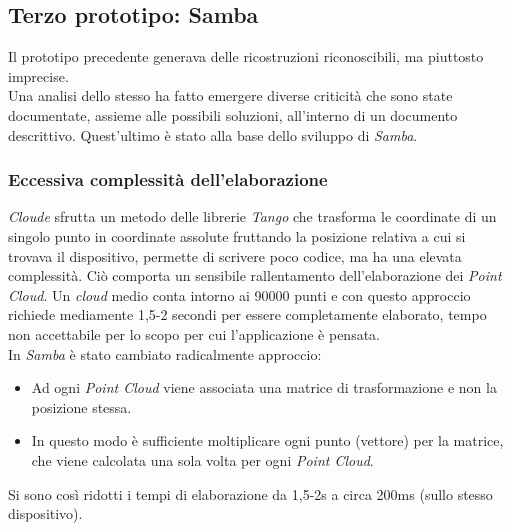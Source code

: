 \subsection{Terzo prototipo: Samba}
Il prototipo precedente generava delle ricostruzioni riconoscibili, ma piuttosto imprecise.\\
Una analisi dello stesso ha fatto emergere diverse criticità che sono state documentate, assieme alle possibili soluzioni, all'interno di un documento descrittivo. Quest'ultimo è stato alla base dello sviluppo di \emph{Samba}.
\subsubsection{Eccessiva complessità dell'elaborazione}
\emph{Cloude} sfrutta un metodo delle librerie \emph{Tango} che trasforma le coordinate di un singolo punto in coordinate assolute fruttando la posizione relativa a cui si trovava il dispositivo, permette di scrivere poco codice, ma ha una elevata complessità. Ciò comporta un sensibile rallentamento dell'elaborazione dei \emph{Point Cloud}. Un \emph{cloud} medio conta intorno ai 90000 punti e con questo approccio richiede mediamente 1,5-2 secondi per essere completamente elaborato, tempo non accettabile per lo scopo per cui l'applicazione è pensata.\\
In \emph{Samba} è stato cambiato radicalmente approccio:
\begin{itemize}
	\item Ad ogni \emph{Point Cloud} viene associata una matrice di trasformazione e non la posizione stessa.
	\item In questo modo è sufficiente moltiplicare ogni punto (vettore) per la matrice, che viene calcolata una sola volta per ogni \emph{Point Cloud}. 
\end{itemize}
Si sono così ridotti i tempi di elaborazione da 1,5-2s a circa 200ms (sullo stesso dispositivo).
